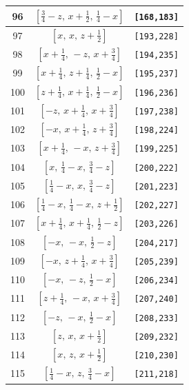 \documentclass[fleqn,8pt]{jsarticle}
\begin{document}
\begin{longtable}{ccc}
96 & $\left[ \frac{3}{4} - z,\, x + \frac{1}{2},\, \frac{1}{4} - x \right]$ & {\tt [168,183]} \\ \hline
97 & $\left[ x,\, x,\, z + \frac{1}{2} \right]$ & {\tt [193,228]} \\ \hline
98 & $\left[ x + \frac{1}{4},\, - z,\, x + \frac{3}{4} \right]$ & {\tt [194,235]} \\ \hline
99 & $\left[ x + \frac{1}{4},\, z + \frac{1}{4},\, \frac{1}{2} - x \right]$ & {\tt [195,237]} \\ \hline
100 & $\left[ z + \frac{1}{4},\, x + \frac{1}{4},\, \frac{1}{2} - x \right]$ & {\tt [196,236]} \\ \hline
101 & $\left[ - z,\, x + \frac{1}{4},\, x + \frac{3}{4} \right]$ & {\tt [197,238]} \\ \hline
102 & $\left[ - x,\, x + \frac{1}{4},\, z + \frac{3}{4} \right]$ & {\tt [198,224]} \\ \hline
103 & $\left[ x + \frac{1}{4},\, - x,\, z + \frac{3}{4} \right]$ & {\tt [199,225]} \\ \hline
104 & $\left[ x,\, \frac{1}{4} - x,\, \frac{3}{4} - z \right]$ & {\tt [200,222]} \\ \hline
105 & $\left[ \frac{1}{4} - x,\, x,\, \frac{3}{4} - z \right]$ & {\tt [201,223]} \\ \hline
106 & $\left[ \frac{1}{4} - x,\, \frac{1}{4} - x,\, z + \frac{1}{2} \right]$ & {\tt [202,227]} \\ \hline
107 & $\left[ x + \frac{1}{4},\, x + \frac{1}{4},\, \frac{1}{2} - z \right]$ & {\tt [203,226]} \\ \hline
108 & $\left[ - x,\, - x,\, \frac{1}{2} - z \right]$ & {\tt [204,217]} \\ \hline
109 & $\left[ - x,\, z + \frac{1}{4},\, x + \frac{3}{4} \right]$ & {\tt [205,239]} \\ \hline
110 & $\left[ - x,\, - z,\, \frac{1}{2} - x \right]$ & {\tt [206,234]} \\ \hline
111 & $\left[ z + \frac{1}{4},\, - x,\, x + \frac{3}{4} \right]$ & {\tt [207,240]} \\ \hline
112 & $\left[ - z,\, - x,\, \frac{1}{2} - x \right]$ & {\tt [208,233]} \\ \hline
113 & $\left[ z,\, x,\, x + \frac{1}{2} \right]$ & {\tt [209,232]} \\ \hline
114 & $\left[ x,\, z,\, x + \frac{1}{2} \right]$ & {\tt [210,230]} \\ \hline
115 & $\left[ \frac{1}{4} - x,\, z,\, \frac{3}{4} - x \right]$ & {\tt [211,218]} \\ \hline

\end{longtable}
\end{document}
